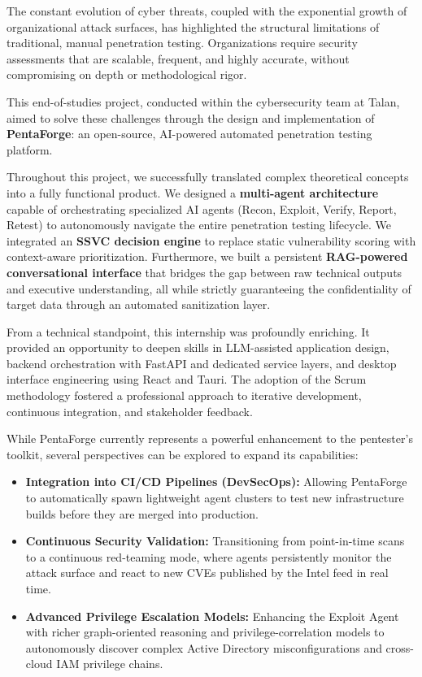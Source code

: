\documentclass[12pt,a4paper]{report}
\begin{document}
The constant evolution of cyber threats, coupled with the exponential growth of organizational 
attack surfaces, has highlighted the structural limitations of traditional, manual 
penetration testing. Organizations require security assessments that are scalable, 
frequent, and highly accurate, without compromising on depth or methodological rigor.

This end-of-studies project, conducted within the cybersecurity team at Talan, aimed to 
solve these challenges through the design and implementation of \textbf{PentaForge}: an 
open-source, AI-powered automated penetration testing platform. 

Throughout this project, we successfully translated complex theoretical concepts into a 
fully functional product. We designed a \textbf{multi-agent architecture} capable of 
orchestrating specialized AI agents (Recon, Exploit, Verify, Report, Retest) to autonomously 
navigate the entire penetration testing lifecycle. We integrated an \textbf{SSVC decision engine} 
to replace static vulnerability scoring with context-aware prioritization. Furthermore, 
we built a persistent \textbf{RAG-powered conversational interface} that bridges the gap 
between raw technical outputs and executive understanding, all while strictly guaranteeing 
the confidentiality of target data through an automated sanitization layer.

From a technical standpoint, this internship was profoundly enriching. It provided an
opportunity to deepen skills in LLM-assisted application design, backend
orchestration with FastAPI and dedicated service layers, and desktop interface
engineering using React and Tauri. The adoption of the Scrum methodology fostered a
professional approach to iterative development, continuous integration, and
stakeholder feedback.

While PentaForge currently represents a powerful enhancement to the pentester's toolkit, 
several perspectives can be explored to expand its capabilities:
\begin{itemize}
    \item \textbf{Integration into CI/CD Pipelines (DevSecOps):} Allowing PentaForge to 
    automatically spawn lightweight agent clusters to test new infrastructure builds 
    before they are merged into production.
    \item \textbf{Continuous Security Validation:} Transitioning from point-in-time scans 
    to a continuous red-teaming mode, where agents persistently monitor the attack surface 
    and react to new CVEs published by the Intel feed in real time.
    \item \textbf{Advanced Privilege Escalation Models:} Enhancing the Exploit Agent
    with richer graph-oriented reasoning and privilege-correlation models to
    autonomously discover complex Active Directory misconfigurations and cross-cloud
    IAM privilege chains.
\end{itemize}
\end{document}
